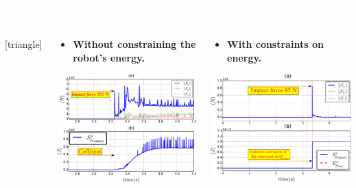 \begin{frame}[noframenumbering]
\frametitle{{\textcolor{white}{\hspace{0.2cm}Simulation results 1}}}
\begin{columns}
\column{\dimexpr\paperwidth-4pt}
[triangle] 
\begin{itemize}
\begin{columns}
\column{.5\paperwidth}
\begin{center}
\begin{itemize}
\addtolength{\itemindent}{3mm}
\item \textbf{Without constraining the robot's energy.}
\end{itemize}
\vspace{0.5mm}
\hspace{1mm}
\includegraphics[width=0.89\columnwidth]{figures/ep__f_tau_!!!!2.pdf}
\end{center}

\begin{center}
\begin{itemize}
\addtolength{\itemindent}{1mm}
\item \textbf{With constraints on energy.}
\end{itemize}
\vspace{0.5mm}
\includegraphics[width=0.89\columnwidth]{figures/ep__f_tau65_!!!!2}


\end{center}
\end{columns}
\end{itemize}
\end{columns}
\end{frame}
